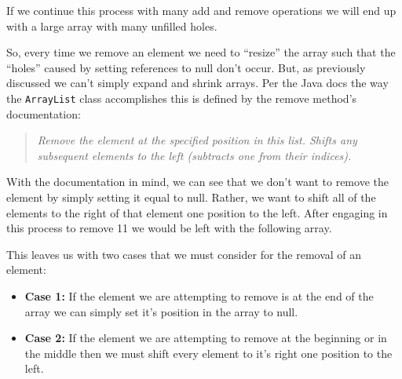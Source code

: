 \documentclass[a4paper]{article}
\begin{document}
If we continue this process with many add and remove operations we will end up
with a large array with many unfilled holes.

\begin{figure}[H]
	\centering
\end{figure}

So, every time we remove an element we need to ``resize'' the array such that
the ``holes'' caused by setting references to null don't occur. But, as
previously discussed we can't simply expand and shrink arrays. Per the Java docs
the way the \lstinline|ArrayList| class accomplishes this is defined 
by the remove method's documentation:

\begin{quote}
\textit{Remove the element at the specified position in this list. Shifts any
subsequent elements to the left (subtracts one from their indices).}
\end{quote}

 With the documentation in mind, we can see that we don't want to remove the
element by simply setting it equal to null. Rather, we want to shift all of the
elements to the right of that element one position to the left. After engaging
in this process to remove 11 we would be left with the following array.\\

\begin{figure}[H]
\centering
{}
\end{figure}

This leaves us with two cases that we must consider for the removal of an element:
\begin{itemize}
	\item \textbf{Case 1: } If the element we are attempting to remove is at the end of the array we can simply set it's position in the array to null.
	\item \textbf{Case 2: } If the element we are attempting to remove at the beginning or in the middle then we must shift every element to it's right one position to the left.
\end{itemize}
\end{document}
